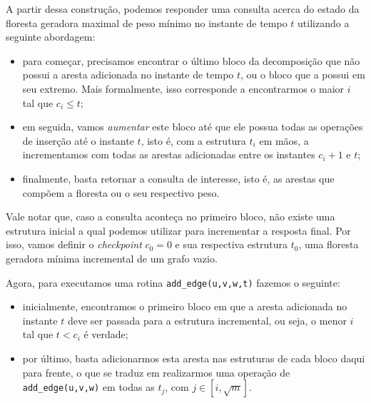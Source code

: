 A partir dessa construção, podemos responder uma consulta acerca do estado da floresta geradora maximal de peso mínimo no instante de tempo $t$ utilizando a seguinte abordagem:

\begin{itemize}
    \item para começar, precisamos encontrar o último bloco da decomposição que não possui a aresta adicionada no instante de tempo $t$, ou o bloco que a possui em seu extremo. Mais formalmente, isso corresponde a encontrarmos o maior $i$ tal que $c_i \leq t$;
    \item em seguida, vamos \emph{aumentar} este bloco até que ele possua todas as operações de inserção até o instante $t$, isto é, com a estrutura $t_i$ em mãos, a incrementamos com todas as arestas adicionadas entre os instantes $c_i + 1$ e $t$;
    \item finalmente, basta retornar a consulta de interesse, isto é, as arestas que compõem a floresta ou o seu respectivo peso.
\end{itemize}

Vale notar que, caso a consulta aconteça no primeiro bloco, não existe uma estrutura inicial a qual podemos utilizar para incrementar a resposta final. Por isso, vamos definir o \emph{checkpoint} $c_0 = 0$ e sua respectiva estrutura $t_0$, uma floresta geradora mínima incremental de um grafo vazio.

Agora, para executamos uma rotina \texttt{add\_edge(u,v,w,t)} fazemos o seguinte:

\begin{itemize}
    \item inicialmente, encontramos o primeiro bloco em que a aresta adicionada no instante $t$ deve ser passada para a estrutura incremental, ou seja, o menor $i$ tal que $t < c_i$ é verdade;
    \item por último, basta adicionarmos esta aresta nas estruturas de cada bloco daqui para frente, o que se traduz em realizarmos uma operação de \texttt{add\_edge(u,v,w)} em todas as $t_j$, com $j \in [i, \sqrt{m}]$.
\end{itemize}

